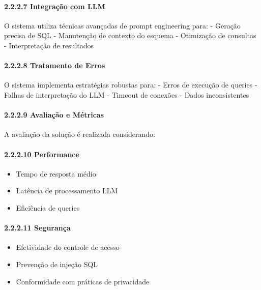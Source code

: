 \documentclass[
]{article}
\providecommand{\tightlist}{%
  \setlength{\itemsep}{0pt}\setlength{\parskip}{0pt}}
\begin{document}
\paragraph{2.2.2.7 Integração com LLM}\label{integrauxe7uxe3o-com-llm}

O sistema utiliza técnicas avançadas de prompt engineering para: -
Geração precisa de SQL - Manutenção de contexto do esquema - Otimização
de consultas - Interpretação de resultados

\paragraph{2.2.2.8 Tratamento de Erros}\label{tratamento-de-erros}

O sistema implementa estratégias robustas para: - Erros de execução de
queries - Falhas de interpretação do LLM - Timeout de conexões - Dados
inconsistentes

\paragraph{2.2.2.9 Avaliação e
Métricas}\label{avaliauxe7uxe3o-e-muxe9tricas}

A avaliação da solução é realizada considerando:

\paragraph{2.2.2.10 Performance}\label{performance}

\begin{itemize}
\tightlist
\item
  Tempo de resposta médio
\item
  Latência de processamento LLM
\item
  Eficiência de queries
\end{itemize}

\paragraph{2.2.2.11 Segurança}\label{seguranuxe7a}

\begin{itemize}
\tightlist
\item
  Efetividade do controle de acesso
\item
  Prevenção de injeção SQL
\item
  Conformidade com práticas de privacidade
\end{itemize}
\end{document}
